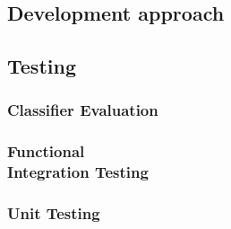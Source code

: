 \subsection{Development approach}
\subsection{Testing}
\subsubsection{Classifier Evaluation}
\subsubsection{Functional\\Integration Testing}
\subsubsection{Unit Testing}
